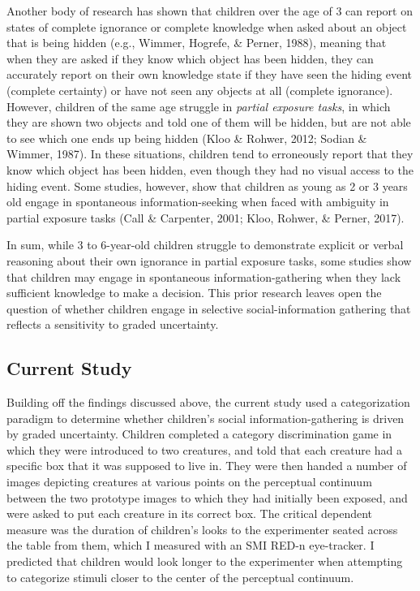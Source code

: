 \documentclass[floatsintext,man]{apa6}
\theoremstyle{definition}
\theoremstyle{definition}
\theoremstyle{definition}
\theoremstyle{remark}
\begin{document}
Another body of research has shown that children over the age of 3 can
report on states of complete ignorance or complete knowledge when asked
about an object that is being hidden (e.g., Wimmer, Hogrefe, \& Perner,
1988), meaning that when they are asked if they know which object has
been hidden, they can accurately report on their own knowledge state if
they have seen the hiding event (complete certainty) or have not seen
any objects at all (complete ignorance). However, children of the same
age struggle in \emph{partial exposure tasks}, in which they are shown
two objects and told one of them will be hidden, but are not able to see
which one ends up being hidden (Kloo \& Rohwer, 2012; Sodian \& Wimmer,
1987). In these situations, children tend to erroneously report that
they know which object has been hidden, even though they had no visual
access to the hiding event. Some studies, however, show that children as
young as 2 or 3 years old engage in spontaneous information-seeking when
faced with ambiguity in partial exposure tasks (Call \& Carpenter, 2001;
Kloo, Rohwer, \& Perner, 2017).

In sum, while 3 to 6-year-old children struggle to demonstrate explicit
or verbal reasoning about their own ignorance in partial exposure tasks,
some studies show that children may engage in spontaneous
information-gathering when they lack sufficient knowledge to make a
decision. This prior research leaves open the question of whether
children engage in selective social-information gathering that reflects
a sensitivity to graded uncertainty.

\subsection{Current Study}\label{current-study}

Building off the findings discussed above, the current study used a
categorization paradigm to determine whether children's social
information-gathering is driven by graded uncertainty. Children
completed a category discrimination game in which they were introduced
to two creatures, and told that each creature had a specific box that it
was supposed to live in. They were then handed a number of images
depicting creatures at various points on the perceptual continuum
between the two prototype images to which they had initially been
exposed, and were asked to put each creature in its correct box. The
critical dependent measure was the duration of children's looks to the
experimenter seated across the table from them, which I measured with an
SMI RED-n eye-tracker. I predicted that children would look longer to
the experimenter when attempting to categorize stimuli closer to the
center of the perceptual continuum.
\end{document}
